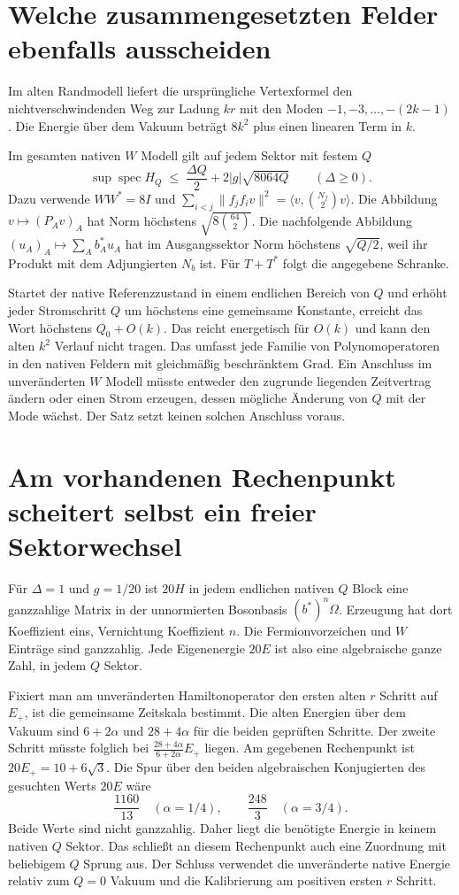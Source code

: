\documentclass[11pt,a4paper]{article}
\begin{document}
\section*{Welche zusammengesetzten Felder ebenfalls ausscheiden}
Im alten Randmodell liefert die ursprüngliche Vertexformel den nichtverschwindenden Weg zur Ladung $kr$ mit den Moden $-1,-3,\ldots,-(2k-1)$. Die Energie über dem Vakuum beträgt $8k^2$ plus einen linearen Term in $k$.

Im gesamten nativen $W$ Modell gilt auf jedem Sektor mit festem $Q$
\[
 \sup\operatorname{spec}H_Q
 \;\le\; \frac{\Delta Q}{2}+2|g|\sqrt{8064Q}
 \qquad(\Delta\ge0).
\]
Dazu verwende $WW^*=8I$ und
$\sum_{i<j}\|f_jf_i v\|^2=\langle v,\binom{N_f}{2}v\rangle$.
Die Abbildung $v\mapsto(P_Av)_A$ hat Norm höchstens
$\sqrt{8\binom{64}{2}}$. Die nachfolgende Abbildung
$(u_A)_A\mapsto\sum_A b_A^*u_A$ hat im Ausgangssektor Norm höchstens
$\sqrt{Q/2}$, weil ihr Produkt mit dem Adjungierten $N_b$ ist.
Für $T+T^*$ folgt die angegebene Schranke.

Startet der native Referenzzustand in einem endlichen Bereich von $Q$ und erhöht jeder Stromschritt $Q$ um höchstens eine gemeinsame Konstante, erreicht das Wort höchstens $Q_0+O(k)$. Das reicht energetisch für $O(k)$ und kann den alten $k^2$ Verlauf nicht tragen. Das umfasst jede Familie von Polynomoperatoren in den nativen Feldern mit gleichmäßig beschränktem Grad. Ein Anschluss im unveränderten $W$ Modell müsste entweder den zugrunde liegenden Zeitvertrag ändern oder einen Strom erzeugen, dessen mögliche Änderung von $Q$ mit der Mode wächst. Der Satz setzt keinen solchen Anschluss voraus.

\section*{Am vorhandenen Rechenpunkt scheitert selbst ein freier Sektorwechsel}
Für $\Delta=1$ und $g=1/20$ ist $20H$ in jedem endlichen nativen $Q$ Block eine ganzzahlige Matrix in der unnormierten Bosonbasis $(b^*)^n\Omega$. Erzeugung hat dort Koeffizient eins, Vernichtung Koeffizient $n$. Die Fermionvorzeichen und $W$ Einträge sind ganzzahlig. Jede Eigenenergie $20E$ ist also eine algebraische ganze Zahl, in jedem $Q$ Sektor.

Fixiert man am unveränderten Hamiltonoperator den ersten alten $r$ Schritt auf $E_+$, ist die gemeinsame Zeitskala bestimmt. Die alten Energien über dem Vakuum sind $6+2\alpha$ und $28+4\alpha$ für die beiden geprüften Schritte. Der zweite Schritt müsste folglich bei $\frac{28+4\alpha}{6+2\alpha}E_+$ liegen. Am gegebenen Rechenpunkt ist $20E_+=10+6\sqrt3$. Die Spur über den beiden algebraischen Konjugierten des gesuchten Werts $20E$ wäre
\[
 \frac{1160}{13}\quad (\alpha=1/4),\qquad
 \frac{248}{3}\quad (\alpha=3/4).
\]
Beide Werte sind nicht ganzzahlig. Daher liegt die benötigte Energie in keinem nativen $Q$ Sektor. Das schließt an diesem Rechenpunkt auch eine Zuordnung mit beliebigem $Q$ Sprung aus. Der Schluss verwendet die unveränderte native Energie relativ zum $Q=0$ Vakuum und die Kalibrierung am positiven ersten $r$ Schritt.
\end{document}
